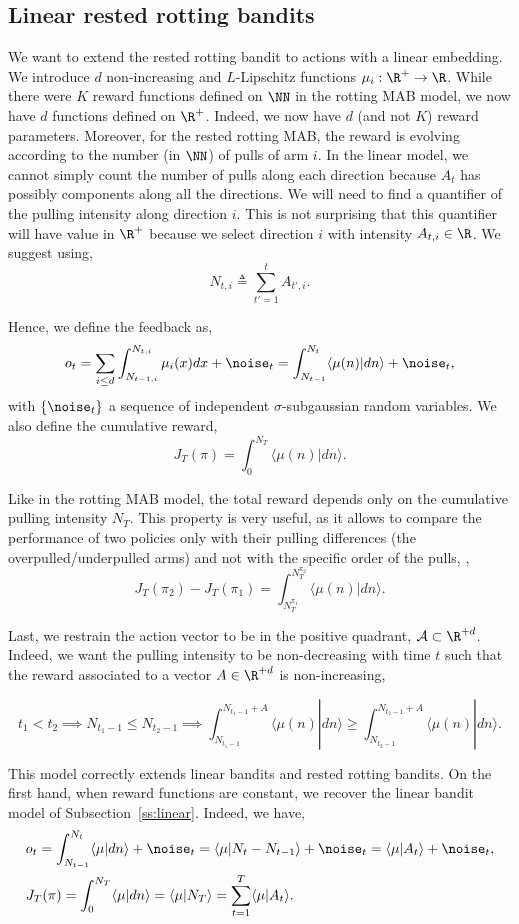 \subsection{Linear rested rotting bandits}
We want to extend the rested rotting bandit to actions with a linear embedding. We introduce $d$ non-increasing and $L$-Lipschitz functions $\mu_i : \R^+ \rightarrow \R$. While there were $K$ reward functions defined on $\NN$ in the rotting MAB model, we now have $d$ functions defined on $\R^+$. Indeed, we now have $d$ (and not $K$) reward parameters. Moreover, for the rested rotting MAB, the reward is evolving according to the number (in $\NN$) of pulls of arm $i$. In the linear model, we cannot simply count the number of pulls along each direction because $A_t$ has possibly components along all the directions. We will need to find a quantifier of the pulling intensity along direction $i$. This is not surprising that this quantifier will have value in $\R^+$ because we select direction $i$ with intensity $A_{t,i} \in \R$. We suggest using, 
\[
N_{t,i} \triangleq \sum_{t'=1}^t A_{t',i}.
\]

Hence, we define the feedback as, 
\[
o_t = \sum_{i\leq d} \int_{N_{t-1,i}}^{N_{t,i}} \mu_i(x)dx +\noise_t  = \int_{N_{t-1}}^{N_{t}} \langle \mu(n) |   dn \rangle  + \noise_t,
\]
with $\{\noise_t\}$ a sequence of independent $\sigma$-subgaussian random variables. We also define the cumulative reward, 
\[
 J_T(\pi) = \int_{0}^{N_{T}} \langle \mu(n) |  dn \rangle.
 \]

Like in the rotting MAB model, the total reward depends only on the cumulative pulling intensity $N_{T}$. This property is very useful, as it allows to compare the performance of two policies only with their pulling differences (the overpulled/underpulled arms) and not with the specific order of the pulls, \ie, 
\[
 J_T(\pi_2) - J_T(\pi_1) = \int_{N_T^{\pi_1}}^{N_{T}^{\pi_2}} \langle \mu(n) |  dn \rangle.
\]

Last, we restrain the action vector to be in the positive quadrant, \ie $\mathcal{A} \subset \R^{+d}$. Indeed, we want the pulling intensity to be non-decreasing with time $t$ such that the reward associated to a vector $A\in \R^{+d} $ is non-increasing, 

\[
t_1 < t_2 \implies  N_{t_1-1} \leq N_{t_2-1}  \implies \int_{N_{t_1-1}}^{N_{t_1-1} + A} \langle \mu(n) |   dn \rangle \geq \int_{N_{t_2-1}}^{N_{t_2-1} + A} \langle \mu(n) |   dn \rangle.
\]

This model correctly extends linear bandits and rested rotting bandits. On the first hand, when reward functions are constant, we recover the linear bandit model of Subsection~\ref{ss:linear}. Indeed, we have,
\begin{align*}
&o_t =  \int_{N_{t-1}}^{N_{t}} \langle \mu |   dn \rangle  + \noise_t =  \langle \mu | N_t - N_{t-1} \rangle  + \noise_t = \langle \mu | A_t \rangle  + \noise_t,\\
& J_T(\pi) = \int_{0}^{N_{T}} \langle \mu |  dn \rangle = \langle \mu | N_T\rangle =  \sum_{t=1}^T \langle \mu | A_t \rangle .
\end{align*}


